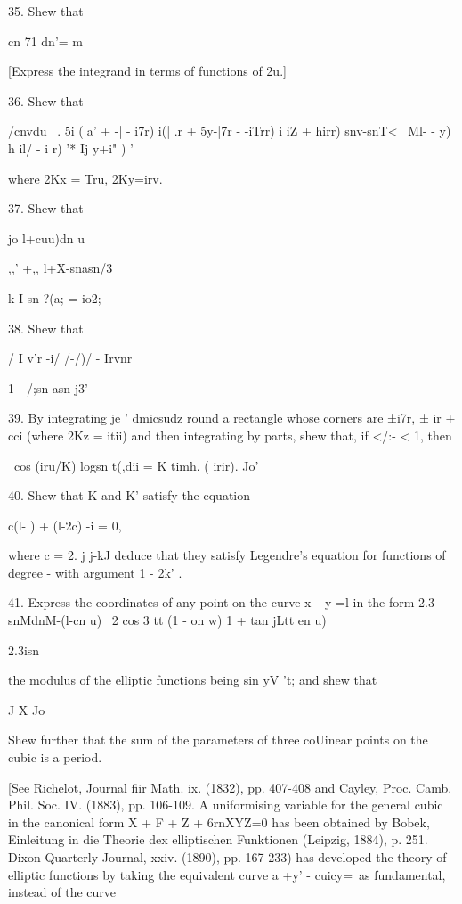 35. Shew that

cn 71 dn'= m

 [Express the integrand in terms of functions of
2u.]

36. Shew that

/cnvdu \ . 5i (|a' + -| - i7r) i(| .r + 5y-|7r - -iTrr) i iZ + hirr)
snv-snT<~ Ml- - y) h il/ - i r) '* Ij y+i" ) '

where 2Kx = Tru, 2Ky=irv. 

37. Shew that

  jo l+cuu)dn u


,,' +,, l+X-snasn/3

k I sn ?(a; = io2;

38. Shew that

/ I v'r -i/ /-/)/ - Irvnr

1 - /;sn asn j3'


39. By integrating je ' dmicsudz round a rectangle whose corners are
±i7r, ± ir + cci (where 2Kz = itii) and then integrating by parts,
shew that, if </:- < 1, then

\ cos (iru/K) logsn t(,dii = K timh. ( irir). Jo'


40. Shew that K and K' satisfy the equation

c(l- ) + (l-2c) -i = 0,

where c = 2. j j-kJ deduce that they satisfy Legendre's equation for
functions of degree - with argument 1 - 2k' .

%
%

41. Express the coordinates of any point on the curve x +y =l in the
form 2.3 snMdnM-(l-cn u) \ 2 cos 3 tt (1 - on w) 1 + tan jLtt en u)

2.3isn%

the modulus of the elliptic functions being sin yV 't; and shew that

J X Jo

Shew further that the sum of the parameters of three coUinear points
on the cubic is a period.

[See Richelot, Journal fiir Math. ix. (1832), pp. 407-408 and Cayley,
Proc. Camb. Phil. Soc. IV. (1883), pp. 106-109. A uniformising
variable for the general cubic in the canonical form X + F + Z +
6rnXYZ=0 has been obtained by Bobek, Einleitung in die Theorie dex
elliptischen Funktionen (Leipzig, 1884), p. 251. Dixon Quarterly
Journal, xxiv. (1890), pp. 167-233) has developed the theory of
elliptic functions by taking the equivalent curve a +y' - cuicy=\ as
fundamental, instead of the curve

